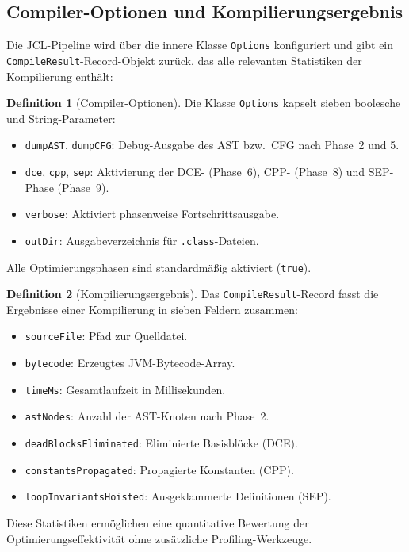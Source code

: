 ﻿\documentclass[a4paper,12pt]{article}
\theoremstyle{definition}
\newtheorem{definition}{Definition}
\begin{document}
\subsection{Compiler-Optionen und Kompilierungsergebnis}

Die JCL-Pipeline wird \"uber die innere Klasse \texttt{Options}
konfiguriert und gibt ein \texttt{CompileResult}-Record-Objekt
zur\"uck, das alle relevanten Statistiken der Kompilierung
enth\"alt:

\begin{definition}[Compiler-Optionen]
Die Klasse \texttt{Options} kapselt sieben boolesche und String-Parameter:
\begin{itemize}
    \item \texttt{dumpAST}, \texttt{dumpCFG}: Debug-Ausgabe des AST
          bzw.\ CFG nach Phase~2 und 5.
    \item \texttt{dce}, \texttt{cpp}, \texttt{sep}: Aktivierung der
          DCE- (Phase~6), CPP- (Phase~8) und SEP-Phase (Phase~9).
    \item \texttt{verbose}: Aktiviert phasenweise Fortschrittsausgabe.
    \item \texttt{outDir}: Ausgabeverzeichnis f\"ur \texttt{.class}-Dateien.
\end{itemize}
Alle Optimierungsphasen sind standardm\"a{\ss}ig aktiviert
(\texttt{true}).
\end{definition}

\begin{definition}[Kompilierungsergebnis]
Das \texttt{CompileResult}-Record fasst die Ergebnisse einer
Kompilierung in sieben Feldern zusammen:
\begin{itemize}
    \item \texttt{sourceFile}: Pfad zur Quelldatei.
    \item \texttt{bytecode}: Erzeugtes JVM-Bytecode-Array.
    \item \texttt{timeMs}: Gesamtlaufzeit in Millisekunden.
    \item \texttt{astNodes}: Anzahl der AST-Knoten nach Phase~2.
    \item \texttt{deadBlocksEliminated}: Eliminierte Basisbl\"ocke (DCE).
    \item \texttt{constantsPropagated}: Propagierte Konstanten (CPP).
    \item \texttt{loopInvariantsHoisted}: Ausgeklammerte Definitionen (SEP).
\end{itemize}
Diese Statistiken erm\"oglichen eine quantitative Bewertung der
Optimierungseffektivit\"at ohne zus\"atzliche Profiling-Werkzeuge.
\end{definition}
\end{document}
